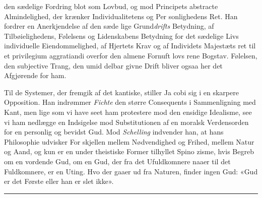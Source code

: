 \documentclass[12pt,a4paper]{book}
\newcommand{\divrule}{\begin{center}\rule{2cm}{0.4pt}\end{center}}
\begin{document}
den sædelige Fordring blot som Lovbud, og mod Principets
abstracte Almindelighed, der krænker Individualitetens og Per\-%
sonlighedens Ret. Han fordrer en Anerkjendelse af den sæde\-%
lige Grund\emph{drifts} Betydning, af Tilbøielighedens, Følelsens og
Lidenskabens Betydning for det sædelige Livs individuelle
Eiendommelighed, af Hjertets Krav og af Individets Majestæts\-%
ret til et privilegium aggratiandi overfor den almene Fornuft\-%
lovs rene Bogstav. Følelsen, den subjective Trang, den umid\-%
delbar givne Drift bliver ogsaa her det Afgjørende for ham.

Til de Systemer, der fremgik af det kantiske, stiller Ja\-%
cobi sig i en skarpere Opposition. Han indrømmer \emph{Fichte}
den større Consequents i Sammenligning med Kant, men lige\-%
som vi have seet ham protestere mod den ensidige Idealisme,
see vi ham nedlægge en Indsigelse mod Substitutionen af en
moralsk Verdensorden for en personlig og bevidst Gud. Mod
\emph{Schelling} indvender han, at hans Philosophie udvisker For\-%
skjellen mellem Nødvendighed og Frihed, mellem Natur og
Aand, og kun er en under theistiske Former tilhyllet Spino\-%
zisme, hvis Begreb om en vordende Gud, om en Gud, der fra
det Ufuldkomnere naaer til det Fuldkomnere, er en Uting.
Hvo der gaaer ud fra Naturen, finder ingen Gud: «Gud er det
Første eller han er slet ikke».

\divrule
\end{document}
